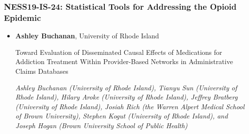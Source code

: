 \subsubsection*{NESS19-IS-24: Statistical Tools for Addressing the Opioid Epidemic}

\begin{itemize}
\item \textbf{Ashley Buchanan}, University of Rhode Island

Toward Evaluation of Disseminated Causal Effects of Medications for Addiction Treatment Within Provider-Based Networks in Administrative Claims Databases

\emph{\footnotesize Ashley Buchanan (University of Rhode Island), Tianyu Sun (University of Rhode Island), Hilary Aroke (University of Rhode Island), Jeffrey Bratberg (University of Rhode Island), Josiah Rich (the Warren Alpert Medical School of Brown University), Stephen Kogut (University of Rhode Island), and Joseph Hogan (Brown University School of Public Health)}


\end{itemize}
